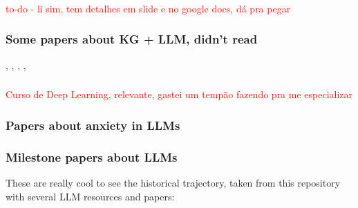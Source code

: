 \documentclass[
  letterpaper,
  DIV=11,
  numbers=noendperiod]{scrartcl}
\begin{document}
\subsubsection{\texorpdfstring{\autocite{Guo2025_DarkMindLatentChainOfThoughtBackdoor}}{{[}@Guo2025\_DarkMindLatentChainOfThoughtBackdoor{]}}}\label{guo2025_darkmindlatentchainofthoughtbackdoor}

\textcolor{red}{to-do - li sim, tem detalhes em slide e no google docs, dá pra pegar}

\subsubsection{Some papers about KG + LLM, didn't
read}\label{some-papers-about-kg-llm-didnt-read}

\autocite{Ibrahim2026},
\autocite{khorashadizadeh2024researchtrendsinterplaylarge},
\autocite{dai2025largelanguagemodelsbetter},
\autocite{kau2024combiningknowledgegraphslarge},
\autocite{Pan2024_UnifyingLargeLanguageModelsAndKnowledgeGraphsARoadmap}

\subsubsection{\texorpdfstring{\autocite{Ng2017_DeepLearningSpecialization}}{{[}@Ng2017\_DeepLearningSpecialization{]}}}\label{ng2017_deeplearningspecialization}

\textcolor{red}{Curso de Deep Learning, relevante, gastei um tempão fazendo pra me especializar}

\subsubsection{Papers about anxiety in
LLMs}\label{papers-about-anxiety-in-llms}

\autocite{codaforno2024inducinganxietylargelanguage}
\autocite{Ben-Zion2025}

\subsubsection{Milestone papers about
LLMs}\label{milestone-papers-about-llms}

These are really cool to see the historical trajectory, taken from this
repository with several LLM resources and papers:
\autocite{Hannibal046AwesomeLLM}
\end{document}
